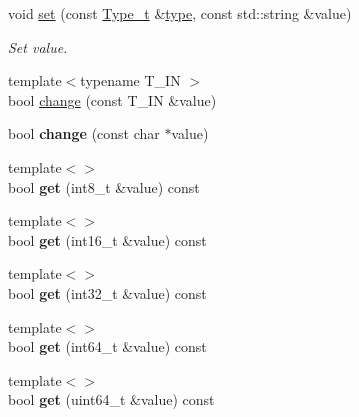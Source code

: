 \begin{DoxyCompactItemize}
\item 
void \hyperlink{classsf_1_1Data_a5d9c2b395b10b0a6359e6c36ab6a22ff}{set} (const \hyperlink{namespacesf_aee849ddcdbf3bdb22d912e4ab0c7b93f}{Type\+\_\+t} \&\hyperlink{classsf_1_1Data_ae7321e2f6bb059074d30ddddcdd7409d}{type}, const std\+::string \&value)
\begin{DoxyCompactList}\small\item\em Set value. \end{DoxyCompactList}\item 
{\footnotesize template$<$typename T\+\_\+\+IN $>$ }\\bool \hyperlink{classsf_1_1Data_afcaf630fd9d6ebf67204af04381afac4}{change} (const T\+\_\+\+IN \&value)
\item 
\mbox{\label{classsf_1_1Data_a267205f998ea8693a37b4f878f6eaec0}} 
bool {\bfseries change} (const char $\ast$value)
\item 
\mbox{\label{classsf_1_1Data_ad643f60b3a4810f7bbc0528ed1aec92a}} 
{\footnotesize template$<$$>$ }\\bool {\bfseries get} (int8\+\_\+t \&value) const
\item 
\mbox{\label{classsf_1_1Data_af527a0f187def1363fe69cb8fdab896b}} 
{\footnotesize template$<$$>$ }\\bool {\bfseries get} (int16\+\_\+t \&value) const
\item 
\mbox{\label{classsf_1_1Data_a6a3cc4c3e8f0af8bf632ae9d52ca42ef}} 
{\footnotesize template$<$$>$ }\\bool {\bfseries get} (int32\+\_\+t \&value) const
\item 
\mbox{\label{classsf_1_1Data_a6247b7275823cb2588577fcecb3ad692}} 
{\footnotesize template$<$$>$ }\\bool {\bfseries get} (int64\+\_\+t \&value) const
\item 
\mbox{\label{classsf_1_1Data_a5a9324e77d49123de1876bf32a550068}} 
{\footnotesize template$<$$>$ }\\bool {\bfseries get} (uint64\+\_\+t \&value) const
\item 
\mbox{\label{classsf_1_1Data_a1471371a0081be5def657b05371031c6}} 

\end{DoxyCompactItemize}

